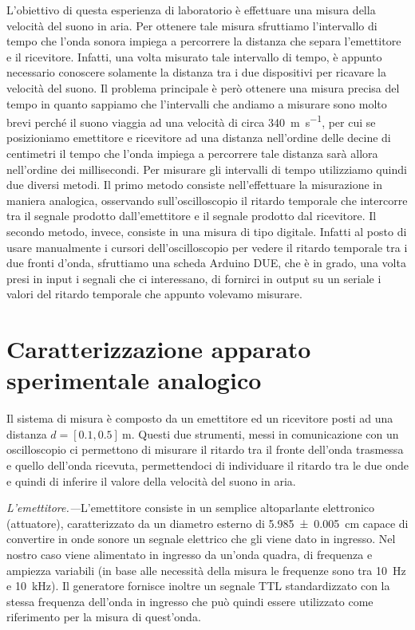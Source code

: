 \documentclass[
    rmp,
    reprint, 
    superscriptaddress, 
    altaffilletter, 
    amsmath, 
    amssymb, 
    a4paper,
    varvw]{revtex4-2}
\begin{document}
L'obiettivo di questa esperienza di laboratorio è effettuare una misura della velocità del suono in aria. Per ottenere tale misura sfruttiamo l'intervallo di tempo che l'onda sonora impiega a percorrere la distanza che separa l'emettitore e il ricevitore. Infatti, una volta misurato tale intervallo di tempo, è appunto necessario conoscere solamente la distanza tra i due dispositivi per ricavare la velocità del suono. Il problema principale è però ottenere una misura precisa del tempo in quanto sappiamo che l'intervalli che andiamo a misurare sono molto brevi perché il suono viaggia ad una velocità di circa \SI{340}{\metre\per\second}, per cui se posizioniamo emettitore e ricevitore ad una distanza nell'ordine delle decine di centimetri il tempo che l'onda impiega a percorrere tale distanza sarà allora nell'ordine dei millisecondi. 
Per misurare gli intervalli di tempo utilizziamo quindi due diversi metodi. Il primo metodo consiste nell'effettuare la misurazione in maniera analogica, osservando sull'oscilloscopio il ritardo temporale che intercorre tra il segnale prodotto dall'emettitore e il segnale prodotto dal ricevitore. Il secondo metodo, invece, consiste in una misura di tipo digitale. Infatti al posto di usare manualmente i cursori dell'oscilloscopio per vedere il ritardo temporale tra i due fronti d'onda, sfruttiamo una scheda Arduino DUE, che è in grado, una volta presi in input i segnali che ci interessano, di fornirci in output su un seriale i valori del ritardo temporale che appunto volevamo misurare.  

\section{Caratterizzazione apparato sperimentale analogico}\label{se:II_caratterizzazione}

Il sistema di misura è composto da un emettitore ed un ricevitore posti ad una distanza $d=[0.1, 0.5]~\si{\metre}$. Questi due strumenti, messi in comunicazione con un oscilloscopio ci permettono di misurare il ritardo tra il fronte dell'onda trasmessa e quello dell'onda ricevuta, permettendoci di individuare il ritardo tra le due onde e quindi di inferire il valore della velocità del suono in aria. 

\noindent\textit{L'emettitore.---}L'emettitore consiste in un semplice altoparlante elettronico (attuatore), caratterizzato da un diametro esterno di \SI{5.985+-0.005}{\centi\metre} capace di convertire in onde sonore un segnale elettrico che gli viene dato in ingresso. Nel nostro caso viene alimentato in ingresso da un'onda quadra, di frequenza e ampiezza variabili (in base alle necessità della misura le frequenze sono tra \SI{10}{\hertz} e \SI{10}{\kilo\hertz}). Il generatore fornisce inoltre un segnale TTL standardizzato con la stessa frequenza dell'onda in ingresso che può quindi essere utilizzato come riferimento per la misura di quest'onda.
\end{document}
